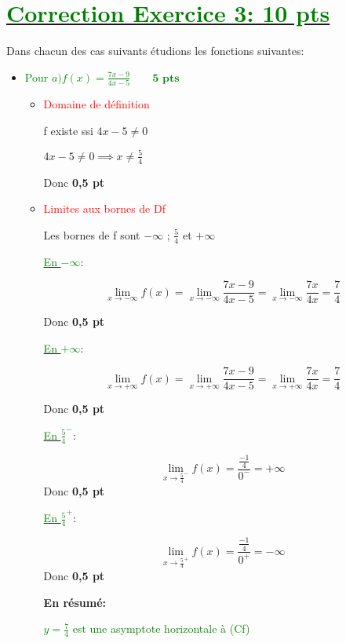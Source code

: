 \documentclass[12pt]{article}
\begin{document}
\section*{\underline{\textcolor{green}{Correction Exercice 3: \textbf{10 pts}}}}
Dans chacun des cas suivants étudions les fonctions suivantes:
\begin{itemize}
\item \textcolor{green}{Pour $a)f(x)=\frac{7x-9}{4x-5}\quad\quad\textbf{5 pts}$}
\begin{itemize}
\item \textcolor{red}{Domaine de définition}

f existe ssi $4x-5\neq 0$

$4x-5\neq 0 \implies x\neq\frac{5}{4}$

Donc \textcolor{green}{}\textbf{ 0,5 pt}

\item \textcolor{red}{Limites aux bornes de Df}

Les bornes de f sont $-\infty$ ; $\frac{5}{4}$ et $+\infty$

\underline{\textcolor{green}{En $-\infty $}}:

\[\lim_{x \to -\infty}f(x)=\lim_{x \to -\infty}\frac{7x-9}{4x-5}=\lim_{x \to -\infty}\frac{7x}{4x}=\frac{7}{4}\]

Donc \textcolor{green}{}\textbf{ 0,5 pt}

\underline{\textcolor{green}{En $+\infty $}}:

\[\lim_{x \to +\infty}f(x)=\lim_{x \to +\infty}\frac{7x-9}{4x-5}=\lim_{x \to +\infty}\frac{7x}{4x}=\frac{7}{4}\]

Donc \textcolor{green}{}\textbf{ 0,5 pt}

\underline{\textcolor{green}{En $\frac{5}{4}^{-}$}}:

\[\lim_{x \to \frac{5}{4}^{-}}f(x)=\frac{\frac{-1}{4}}{0^{-}}=+\infty\]
Donc \textcolor{green}{}\textbf{ 0,5 pt}

\underline{\textcolor{green}{En $\frac{5}{4}^{+}$}}:

\[\lim_{x \to \frac{5}{4}^{+}}f(x)=\frac{\frac{-1}{4}}{0^{+}}=-\infty\]
Donc \textcolor{green}{}\textbf{ 0,5 pt}

\textbf{En résumé:}

\textcolor{green}{$y=\frac{7}{4}$ est une asymptote horizontale à (Cf)}


\end{itemize}
\end{itemize}
\end{document}
